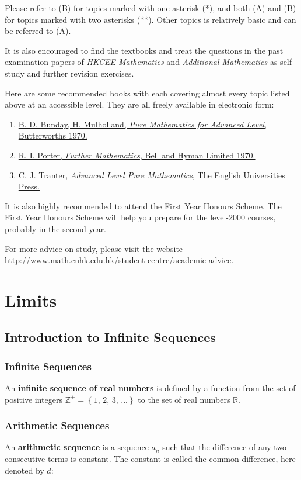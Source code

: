 \documentclass[a4paper,12pt]{article}
\newcommand{\n}{\vspace{3mm}}
\newcommand{\R}{\mathbb{R}}
\newcommand{\Z}{\mathbb{Z}}
\newenvironment{rlist}{ %
\begin{enumerate}[label=(\roman*)]
}{
\end{enumerate}
}
\begin{document}
Please refer to (B) for topics marked with one asterisk (*), and both (A) and (B) for topics marked with two asterisks (**). Other topics is relatively basic and can be referred to (A).\n

It is also encouraged to find the textbooks and treat the questions in the past examination papers of \textit{HKCEE Mathematics} and \textit{Additional Mathematics} as self-study and further revision exercises.\n

Here are some recommended books with each covering almost every topic listed above at an accessible level. They are all freely available in electronic form:
\begin{rlist}
  \item \href{https://archive.org/details/PureMathematicsForAdvancedLevel}{B. D. Bunday, H. Mulholland, \textit{Pure Mathematics for Advanced Level}, Butterworths 1970.}
  \item \href{https://archive.org/details/FurtherMathematics}{R. I. Porter, \textit{Further Mathematics}, Bell and Hyman Limited 1970.}
  \item \href{https://archive.org/details/in.ernet.dli.2015.285850}{C. J. Tranter, \textit{Advanced Level Pure Mathematics}, The English Universities Press.}
\end{rlist}

It is also highly recommended to attend the First Year Honours Scheme. The First Year Honours Scheme will help you prepare for the level-2000 courses, probably in the second year.\n

For more advice on study, please visit the website \url{http://www.math.cuhk.edu.hk/student-centre/academic-advice}.
\pagebreak

\section{Limits}
\subsection{Introduction to Infinite Sequences}
\subsubsection{Infinite Sequences}
An \textbf{infinite sequence of real numbers} is defined by a function from the set of positive integers $\Z^{+}=\left\{ 1\text{, }2\text{, }3\text{, ...} \right\}$ to the set of real numbers $\R$.\n

\subsubsection{Arithmetic Sequences}
An \textbf{arithmetic sequence} is a sequence $a_{n}$ such that the difference of any two consecutive terms is constant. The constant is called the common difference, here denoted by $d$:
\end{document}
